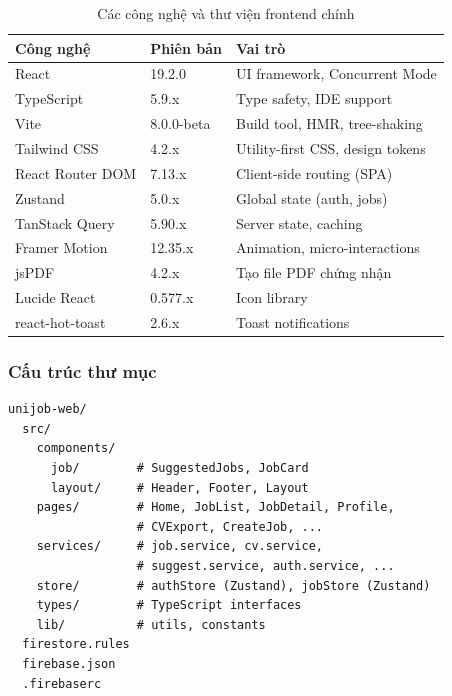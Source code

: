 \begin{table}[H]
\centering
\caption{Các công nghệ và thư viện frontend chính}
\renewcommand{\arraystretch}{1.2}
\begin{tabularx}{\textwidth}{|p{3.5cm}|p{2.5cm}|X|}
\hline
\textbf{Công nghệ} & \textbf{Phiên bản} & \textbf{Vai trò} \\
\hline
React              & 19.2.0    & UI framework, Concurrent Mode \\
\hline
TypeScript         & 5.9.x     & Type safety, IDE support \\
\hline
Vite               & 8.0.0-beta & Build tool, HMR, tree-shaking \\
\hline
Tailwind CSS       & 4.2.x     & Utility-first CSS, design tokens \\
\hline
React Router DOM   & 7.13.x    & Client-side routing (SPA) \\
\hline
Zustand            & 5.0.x     & Global state (auth, jobs) \\
\hline
TanStack Query     & 5.90.x    & Server state, caching \\
\hline
Framer Motion      & 12.35.x   & Animation, micro-interactions \\
\hline
jsPDF              & 4.2.x     & Tạo file PDF chứng nhận \\
\hline
Lucide React       & 0.577.x   & Icon library \\
\hline
react-hot-toast    & 2.6.x     & Toast notifications \\
\hline
\end{tabularx}
\end{table}

\subsubsection{Cấu trúc thư mục}

\begin{lstlisting}[language={}, caption={Project directory structure}]
unijob-web/
  src/
    components/
      job/        # SuggestedJobs, JobCard
      layout/     # Header, Footer, Layout
    pages/        # Home, JobList, JobDetail, Profile,
                  # CVExport, CreateJob, ...
    services/     # job.service, cv.service,
                  # suggest.service, auth.service, ...
    store/        # authStore (Zustand), jobStore (Zustand)
    types/        # TypeScript interfaces
    lib/          # utils, constants
  firestore.rules
  firebase.json
  .firebaserc
\end{lstlisting}

